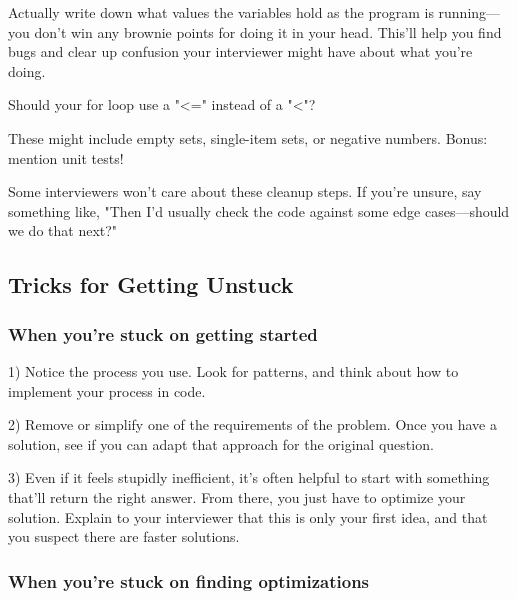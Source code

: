 \documentclass{article}
\begin{document}
 Actually write down what values the variables hold as the program is running—you don't win any brownie points for doing it in your head. This'll help you find bugs and clear up confusion your interviewer might have about what you're doing.

 Should your for loop use a "<=" instead of a "<"?

 These might include empty sets, single-item sets, or negative numbers. Bonus: mention unit tests!

 Some interviewers won't care about these cleanup steps. If you're unsure, say something like, "Then I'd usually check the code against some edge cases—should we do that next?"



\subsection{Tricks for Getting Unstuck}

\subsubsection{When you’re stuck on getting started}

1)  Notice the process you use. Look for patterns, and think about how to implement your process in code.

2)  Remove or simplify one of the requirements of the problem. Once you have a solution, see if you can adapt that approach for the original question.

3)  Even if it feels stupidly inefficient, it’s often helpful to start with something that’ll return the right answer. From there, you just have to optimize your solution. Explain to your interviewer that this is only your first idea, and that you suspect there are faster solutions.






\subsubsection{When you’re stuck on finding optimizations}
\end{document}
